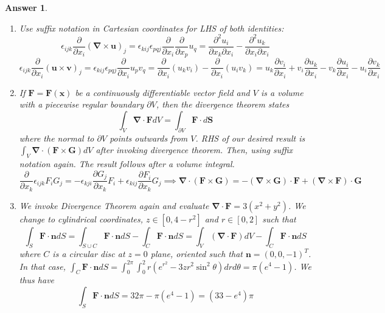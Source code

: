 \documentclass[a4paper]{article}
\newtheorem{ans}{Answer}[section]
\theoremstyle{new}
\begin{document}
\begin{ans}\leavevmode
\begin{enumerate}[label=(\roman*)]
    \item Use suffix notation in Cartesian coordinates for LHS of both identities:
$$\epsilon_{ijk}\frac{\partial}{\partial x_i}(\boldsymbol{\nabla}\times\mathbf{u})_j=\epsilon_{kij}\epsilon_{pqj}\frac{\partial}{\partial x_i}\frac{\partial}{\partial x_p}u_q=\frac{\partial^2u_i}{\partial x_k\partial x_i}-\frac{\partial^2u_k}{\partial x_i\partial x_i}$$
$$\epsilon_{ijk}\frac{\partial}{\partial x_i}(\mathbf{u}\times\mathbf{v})_j=\epsilon_{kij}\epsilon_{pqj}\frac{\partial}{\partial x_i}u_pv_q=\frac{\partial}{\partial x_i}(u_kv_i)-\frac{\partial}{\partial x_i}(u_iv_k)=u_k\frac{\partial v_i}{\partial x_i}+v_i\frac{\partial u_k}{\partial x_i}-v_k\frac{\partial u_i}{\partial x_i}-u_i\frac{\partial v_k}{\partial x_i}$$
\item If $\mathbf{F}=\mathbf{F}(\mathbf{x})$ be a continuously differentiable vector field and $V$ is a volume with a piecewise regular boundary $\partial V$, then the divergence theorem states
$$\int_V\boldsymbol{\nabla}\cdot\mathbf{F}dV=\int_{\partial V}\mathbf{F}\cdot d\mathbf{S}$$
where the normal to $\partial V$ points outwards from $V$. RHS of our desired result is $\int_V\boldsymbol{\nabla}\cdot(\mathbf{F}\times\mathbf{G})dV$ after invoking divergence theorem. Then, using suffix notation again. The result follows after a volume integral.
$$\frac{\partial}{\partial x_k}\epsilon_{ijk}F_iG_j=-\epsilon_{kji}\frac{\partial G_j}{\partial x_k}F_i+\epsilon_{kij}\frac{\partial F_i}{\partial x_k}G_j\implies\boldsymbol{\nabla}\cdot(\mathbf{F}\times\mathbf{G})=-(\boldsymbol{\nabla}\times\mathbf{G})\cdot\mathbf{F}+(\boldsymbol{\nabla}\times\mathbf{F})\cdot\mathbf{G}$$ 
\item We invoke Divergence Theorem again and evaluate $\boldsymbol{\nabla}\cdot\mathbf{F}=3(x^2+y^2)$. We change to cylindrical coordinates, $z\in[0,4-r^2]$ and $r\in[0,2]$ such that
$$\int_S\mathbf{F}\cdot\mathbf{n}dS=\int_{S\cup C}\mathbf{F}\cdot\mathbf{n}dS-\int_C\mathbf{F}\cdot\mathbf{n}dS=\int_V(\boldsymbol{\nabla}\cdot\mathbf{F})dV-\int_C\mathbf{F}\cdot\mathbf{n}dS$$
where $C$ is a circular disc at $z=0$ plane, oriented such that $\mathbf{n}=(0,0,-1)^T$. In that case, $\int_C\mathbf{F}\cdot\mathbf{n}dS=\int_0^{2\pi}\int_0^2 r(e^{r^2}-3zr^2\sin^2\theta)drd\theta=\pi(e^4-1)$. We thus have
$$\int_S\mathbf{F}\cdot\mathbf{n}dS=32\pi-\pi(e^4-1)=(33-e^4)\pi$$
\end{enumerate}
\end{ans}
\end{document}

